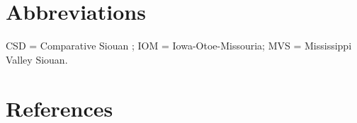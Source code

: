 \documentclass[output=paper]{LSP/langsci}
\begin{document}
\section*{Abbreviations}

CSD = Comparative Siouan \citet{Dictionary2006}; IOM = Iowa-Otoe-Missouria; MVS = Mississippi Valley Siouan.


\section*{References} 

\newenvironment{reflist} {\begin{list} {} {\listparindent -.25in
\leftmargin .3in} \item \ \vspace{-.3in} } {\end{list} }
\end{document}

